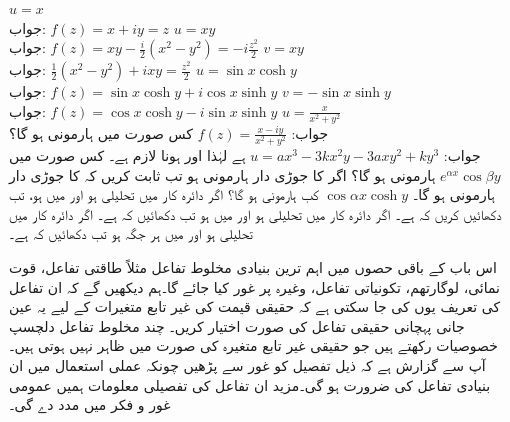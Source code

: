 \quad
$u=x$\\
جواب:\quad
$f(z)=x+iy=z$
\quad
$u=xy$\\
جواب:\quad
$f(z)=xy-\tfrac{i}{2}(x^2-y^2)=-i\frac{z^2}{2}$
\quad
$v=xy$\\
جواب:\quad
$\tfrac{1}{2}(x^2-y^2)+ixy=\tfrac{z^2}{2}$
\quad
$u=\sin x\cosh y$\\
جواب:\quad
$f(z)=\sin x\cosh y+i\cos x\sinh y$
\quad
$v=-\sin x\sinh y$\\
جواب:\quad
$f(z)=\cos x\cosh y-i\sin x\sinh y$
\quad
$u=\frac{x}{x^2+y^2}$\\
جواب:\quad
$f(z)=\frac{x-iy}{x^2+y^2}$
\quad
کس صورت میں   ہارمونی ہو گا؟\\
جواب:\quad
$u=ax^3-3kx^2y-3axy^2+ky^3$ 
ہے لہٰذا  اور  ہونا لازم ہے۔
\quad
کس صورت میں 
$e^{\alpha x}\cos \beta y$
 ہارمونی ہو گا؟
\quad
اگر  کا جوڑی دار ہارمونی  ہو تب ثابت کریں کہ  کا جوڑی دار ہارمونی  ہو گا۔
\quad
$\cos \alpha x\cosh y$
کب ہارمونی ہو گا؟
\quad
اگر دائرہ کار  میں  تحلیلی ہو اور  میں  ہو، تب دکھائیں کریں کہ  ہے۔
\quad
اگر دائرہ کار  میں  تحلیلی ہو اور  میں  ہو تب دکھائیں کہ  ہے۔
\quad
اگر دائرہ کار  میں  تحلیلی ہو اور  میں ہر جگہ  ہو تب دکھائیں کہ  ہے۔

اس  باب کے باقی حصوں میں اہم ترین بنیادی مخلوط تفاعل مثلاً طاقتی تفاعل، قوت نمائی، لوگارتھم، تکونیاتی تفاعل، وغیرہ پر غور کیا جائے گا۔ہم دیکھیں گے کہ ان تفاعل کی تعریف یوں کی جا سکتی ہے کہ حقیقی قیمت کی غیر تابع متغیرات کے لیے یہ عین جانی پہچانی حقیقی تفاعل کی صورت اختیار کریں۔ چند مخلوط تفاعل دلچسپ خصوصیات  رکھتے ہیں جو حقیقی غیر تابع متغیرہ کی صورت میں
  ظاہر نہیں ہوتی ہیں۔آپ سے گزارش ہے کہ ذیل تفصیل کو غور سے پڑھیں چونکہ عملی استعمال میں ان بنیادی تفاعل کی ضرورت ہو گی۔مزید ان تفاعل کی تفصیلی معلومات ہمیں عمومی غور و فکر میں مدد دے گی۔

